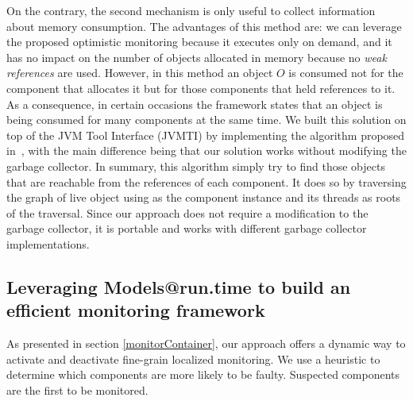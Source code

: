 On the contrary, the second mechanism is only useful to collect information about memory consumption.
The advantages of this method are: we can leverage the proposed optimistic monitoring because it executes only on demand, and it has no impact on the number of objects allocated in memory because no \textit{weak references} are used.
However, in this method an object $O$ is consumed not for the component that allocates it but for those components that held references to it.
As a consequence, in certain occasions the framework states that an object is being consumed for many components at the same time. 
We built this solution on top of the JVM Tool Interface (JVMTI) by implementing the algorithm proposed in~\cite{Price:2003:GCM:829515.830545, Geoffray5270296}, with the main difference being that our solution works without modifying the garbage collector.
In summary, this algorithm simply try to find those objects that are reachable from the references of each component.
It does so by traversing the graph of live object using as the component instance and its threads as roots of the traversal. 
Since our approach does not require a modification to the garbage collector, it is portable and works with different garbage collector implementations.



\subsection{Leveraging Models@run.time to build an efficient monitoring framework}\label{sec:heuristic-based-on-modeling}
As presented in section \ref{monitorContainer}, our approach offers a dynamic way to activate and deactivate fine-grain localized monitoring.
We use a heuristic to determine which components are more likely to be faulty.
Suspected components are the first to be monitored.


